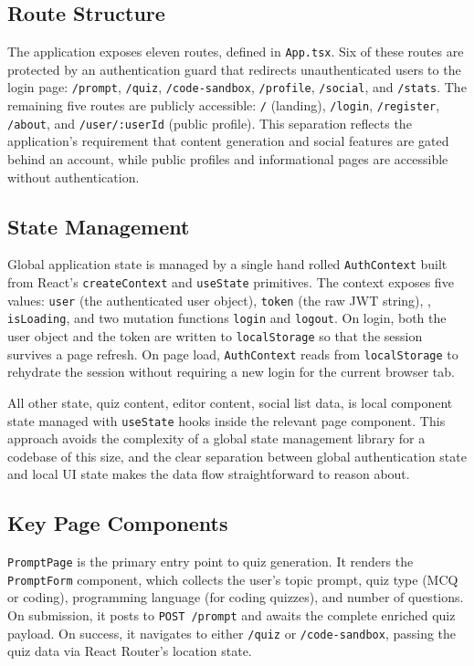 \subsection{Route Structure}

The application exposes eleven routes, defined in \texttt{App.tsx}. Six
of these routes are protected by an authentication guard that redirects
unauthenticated users to the login page: \texttt{/prompt},
\texttt{/quiz}, \texttt{/code-sandbox}, \texttt{/profile},
\texttt{/social}, and \texttt{/stats}. The remaining five routes are
publicly accessible: \texttt{/} (landing), \texttt{/login},
\texttt{/register}, \texttt{/about}, and \texttt{/user/:userId} (public
profile). This separation reflects the application's requirement that
content generation and social features are gated behind an account,
while public profiles and informational pages are accessible without
authentication.

\subsection{State Management}

Global application state is managed by a single hand rolled
\texttt{AuthContext} built from React's \texttt{createContext} and
\texttt{useState} primitives. The context exposes five values:
\texttt{user} (the authenticated user object), \texttt{token} (the raw
JWT string), , \texttt{isLoading}, and two
mutation functions \texttt{login} and \texttt{logout}. On login, both
the user object and the token are written to \texttt{localStorage} so
that the session survives a page refresh. On page load,
\texttt{AuthContext} reads from \texttt{localStorage} to rehydrate the
session without requiring a new login for the current browser tab.

All other state, quiz content, editor content, social list data, is
local component state managed with \texttt{useState} hooks inside the
relevant page component. This approach avoids the complexity of a
global state management library for a codebase of this size, and the
clear separation between global authentication state and local UI
state makes the data flow straightforward to reason about.

\subsection{Key Page Components}

\texttt{PromptPage} is the primary entry point to quiz generation. It
renders the \texttt{PromptForm} component, which collects the user's
topic prompt, quiz type (MCQ or coding), programming language (for
coding quizzes), and number of questions. On submission, it posts to
\texttt{POST /prompt} and awaits the complete enriched quiz payload.
On success, it navigates to either \texttt{/quiz} or
\texttt{/code-sandbox}, passing the quiz data via React Router's
location state.

